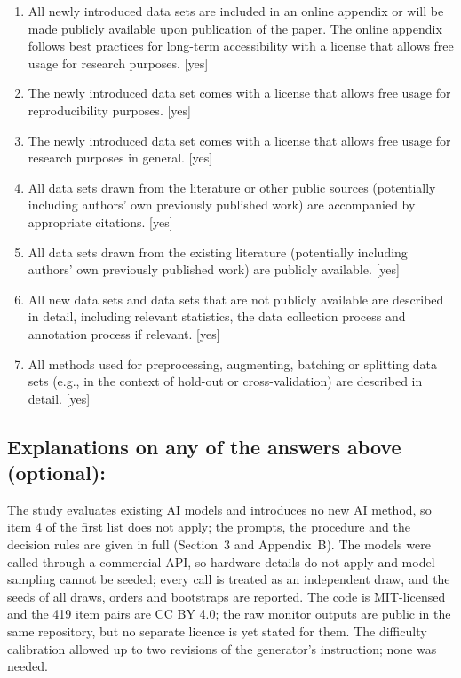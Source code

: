 \documentclass[manuscript, screen, review]{jair}
\begin{document}
\begin{enumerate}
    \item
    All newly introduced data sets
    are included in an online appendix
    or will be made publicly available upon publication of the paper.
    The online appendix follows best practices for long-term accessibility with a license
    that allows free usage for research purposes.
    [yes]
    \item The newly introduced data set comes with a license that
    allows free usage for reproducibility purposes.
    [yes]
    \item The newly introduced data set comes with a license that
    allows free usage for research purposes in general.
    [yes]
    \item All data sets drawn from the literature or other public sources (potentially including authors' own previously published work) are accompanied by appropriate citations.
    [yes]
    \item All data sets drawn from the existing literature (potentially including authors’ own previously published work) are publicly available. [yes]
    \item All new data sets and data sets that are not publicly available are described in detail, including relevant statistics, the data collection process and annotation process if relevant.
    [yes]
    \item
    All methods used for preprocessing, augmenting, batching or splitting data sets (e.g., in the context of hold-out or cross-validation)
    are described in detail. [yes]
\end{enumerate}

\subsection*{Explanations on any of the answers above (optional):}

The study evaluates existing AI models and introduces no new AI method, so item 4 of the first list does not apply; the prompts, the procedure and the decision rules are given in full (Section~3 and Appendix~B). The models were called through a commercial API, so hardware details do not apply and model sampling cannot be seeded; every call is treated as an independent draw, and the seeds of all draws, orders and bootstraps are reported. The code is MIT-licensed and the 419 item pairs are CC BY 4.0; the raw monitor outputs are public in the same repository, but no separate licence is yet stated for them. The difficulty calibration allowed up to two revisions of the generator's instruction; none was needed.
\end{document}

